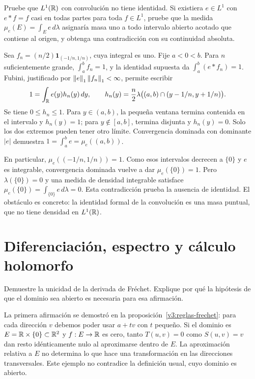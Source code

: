 \begin{ejercicio}\label{ej:v3-l20-5}
Pruebe que $L^1(\mathbb R)$ con convolución no tiene identidad. Si existiera $e\in L^1$ con $e*f=f$ casi en todas partes para toda $f\in L^1$, pruebe que la medida $\mu_e(E)=\int_E e\,d\lambda$ asignaría masa uno a todo intervalo abierto acotado que contiene al origen, y obtenga una contradicción con su continuidad absoluta.
\end{ejercicio}
\begin{solucion}
Sea $f_n=(n/2)\mathbf1_{(-1/n,1/n)}$, cuya integral es uno. Fije $a<0<b$. Para $n$ suficientemente grande, $\int_a^b f_n=1$, y la identidad supuesta da $\int_a^b(e*f_n)=1$. Fubini, justificado por $\left\lVert e\right\rVert_1\left\lVert f_n\right\rVert_1<\infty$, permite escribir
\[
 1=\int_\mathbb R e(y)h_n(y)\,dy,
 \qquad h_n(y)=\frac n2\lambda\big((a,b)\cap(y-1/n,y+1/n)\big).
\]
Se tiene $0\leq h_n\leq1$. Para $y\in(a,b)$, la pequeña ventana termina contenida en el intervalo y $h_n(y)=1$; para $y\notin[a,b]$, termina disjunta y $h_n(y)=0$. Solo los dos extremos pueden tener otro límite. Convergencia dominada con dominante $|e|$ demuestra
$1=\int_a^b e=\mu_e((a,b))$.

En particular, $\mu_e((-1/n,1/n))=1$. Como esos intervalos decrecen a $\{0\}$ y $e$ es integrable, convergencia dominada vuelve a dar $\mu_e(\{0\})=1$. Pero $\lambda(\{0\})=0$ y una medida de densidad integrable satisface $\mu_e(\{0\})=\int_{\{0\}}e\,d\lambda=0$. Esta contradicción prueba la ausencia de identidad. El obstáculo es concreto: la identidad formal de la convolución es una masa puntual, que no tiene densidad en $L^1(\mathbb R)$.
\end{solucion}

\chapter{Diferenciación, espectro y cálculo holomorfo}

\begin{ejercicio}\label{ej:v3-l21-1}
Demuestre la unicidad de la derivada de Fréchet. Explique por qué la hipótesis de que el dominio sea abierto es necesaria para esa afirmación.
\end{ejercicio}
\begin{solucion}
La primera afirmación se demostró en la proposición~\ref{v3:reglas-frechet}: para cada dirección $v$ debemos poder usar $a+tv$ con $t$ pequeño. Si el dominio es $E=\mathbb R\times\{0\}\subset\mathbb R^2$ y $f:E\to\mathbb R$ es cero, tanto $T(u,v)=0$ como $S(u,v)=v$ dan resto idénticamente nulo al aproximarse dentro de $E$. La aproximación relativa a $E$ no determina lo que hace una transformación en las direcciones transversales. Este ejemplo no contradice la definición usual, cuyo dominio es abierto.
\end{solucion}

